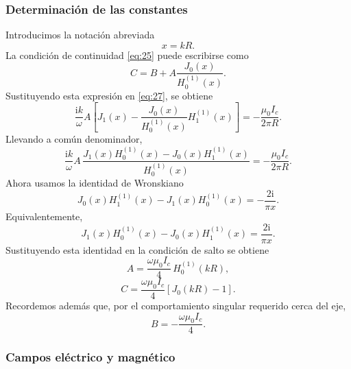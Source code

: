 \documentclass{article}
\numberwithin{equation}{section}
\newcommand{\iu}{\mathrm{i}}
\begin{document}
\subsubsection{Determinación de las constantes}

Introducimos la notación abreviada
\begin{equation*}
    x=kR.
\end{equation*}
La condición de continuidad \eqref{eq:25} puede escribirse como
\begin{equation*}
    C=B+A\frac{J_0(x)}{H_0^{(1)}(x)}.
\end{equation*}
Sustituyendo esta expresión en \eqref{eq:27}, se obtiene
\begin{equation*}
    \frac{\iu k}{\omega}A\left[J_1(x)-\frac{J_0(x)}{H_0^{(1)}(x)}H_1^{(1)}(x)\right]
    =-\frac{\mu_0 I_c}{2\pi R}.
\end{equation*}
Llevando a común denominador,
\begin{equation*}
    \frac{\iu k}{\omega}A\,
    \frac{J_1(x)H_0^{(1)}(x)-J_0(x)H_1^{(1)}(x)}{H_0^{(1)}(x)}
    =-\frac{\mu_0 I_c}{2\pi R}.
\end{equation*}
Ahora usamos la identidad de Wronskiano
\begin{equation}\tag{28}\label{eq:28}
    J_0(x)H_1^{(1)}(x)-J_1(x)H_0^{(1)}(x)=-\frac{2\iu}{\pi x}.
\end{equation}
Equivalentemente,
\begin{equation*}
    J_1(x)H_0^{(1)}(x)-J_0(x)H_1^{(1)}(x)=\frac{2\iu}{\pi x}.
\end{equation*}
Sustituyendo esta identidad en la condición de salto se obtiene
\begin{equation}\tag{29}\label{eq:29}
    A=\frac{\omega\mu_0 I_c}{4}\,H_0^{(1)}(kR),
\end{equation}
\begin{equation}\tag{30}\label{eq:30}
    C=\frac{\omega\mu_0 I_c}{4}\left[J_0(kR)-1\right].
\end{equation}
Recordemos además que, por el comportamiento singular requerido cerca del eje,
\begin{equation*}
    B=-\frac{\omega\mu_0 I_c}{4}.
\end{equation*}

\subsubsection{Campos eléctrico y magnético}
\end{document}
